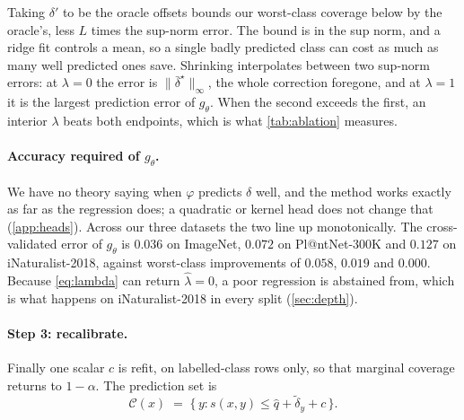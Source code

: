 Taking $\delta'$ to be the oracle offsets bounds our worst-class coverage below by the
oracle's, less $L$ times the sup-norm error. The bound is in the sup norm, and a ridge fit
controls a mean, so a single badly predicted class can cost as much as many well predicted ones
save. Shrinking interpolates between two sup-norm errors: at $\lambda=0$ the error is
$\|\bar\delta^\star\|_\infty$, the whole correction foregone, and at $\lambda=1$ it is the
largest prediction error of $g_\theta$. When the second exceeds the first, an interior
$\lambda$ beats both endpoints, which is what \cref{tab:ablation} measures.

\paragraph{Accuracy required of $g_\theta$.} We have no theory saying when $\varphi$ predicts
$\delta$ well, and the method works exactly as far as the regression does; a quadratic or
kernel head does not change that (\cref{app:heads}). Across our three
datasets the two line up monotonically. The cross-validated error of $g_\theta$ is $0.036$ on
ImageNet, $0.072$ on Pl@ntNet-300K and $0.127$ on iNaturalist-2018, against worst-class
improvements of $0.058$, $0.019$ and $0.000$. Because \cref{eq:lambda} can return $\hat\lambda=0$, a poor regression is
abstained from, which is what happens on iNaturalist-2018 in every split (\cref{sec:depth}).

\paragraph{Step 3: recalibrate.} Finally one scalar $c$ is refit, on labelled-class rows only,
so that marginal coverage returns to $1-\alpha$. The prediction set is
\begin{equation}
\mathcal{C}(x) \;=\; \bigl\{\, y : s(x,y) \le \hat q + \tilde\delta_y + c \,\bigr\}.
\label{eq:set}
\end{equation}

